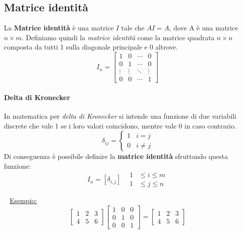 \documentclass[11pt,oneside]{book}
\begin{document}
\subsection{Matrice identità}
La \textbf{Matrice identità} è una matrice $I$ tale che $AI = A$, dove A è una matrice $n \times m$.
Definiamo quindi la \emph{matrice identità} come la matrice quadrata $n \times n$ composta da tutti 1 sulla diagonale principale
e 0 altrove.
\begin{equation*}
    I_n =
    \begin{bmatrix}
        1      & 0      & \cdots & 0      \\
        0      & 1      & \cdots & 0      \\
        \vdots & \vdots & \ddots & \vdots \\
        0      & 0      & \cdots & 1
    \end{bmatrix}
\end{equation*}

\paragraph{Delta di Kronecker}
In matematica per \emph{delta di Kronecker} si intende una funzione di due variabili discrete
che vale 1 se i loro valori coincidono, mentre vale 0 in caso contrario.
\begin{equation*}
    \delta_{ij} =
    \begin{cases}
        1 \;\;\; i=j \\
        0 \;\;\; i \neq j
    \end{cases}
\end{equation*}
Di conseguenza è possibile definire la \textbf{matrice identità} sfruttando questa funzione:
\begin{equation*}
    I_n = [\delta_{i,j}] \;\;\; \scriptstyle \begin{aligned} 1&\le i\le m\\ 1&\le j\le n \end{aligned}
\end{equation*}

~\newline
\underline{Esempio:}
\begin{equation*}
    \begin{bmatrix}
        1 & 2 & 3 \\
        4 & 5 & 6
    \end{bmatrix}
    \begin{bmatrix}
        1 & 0 & 0 \\
        0 & 1 & 0 \\
        0 & 0 & 1
    \end{bmatrix} = 
    \begin{bmatrix}
        1 & 2 & 3 \\
        4 & 5 & 6
    \end{bmatrix}
\end{equation*}
\end{document}
